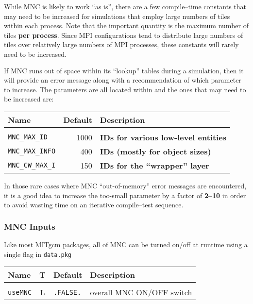 While MNC is likely to work ``as is'', there are a few compile--time
constants that may need to be increased for simulations that employ
large numbers of tiles within each process.  Note that the important
quantity is the maximum number of tiles \textbf{per process}.  Since
MPI configurations tend to distribute large numbers of tiles over
relatively large numbers of MPI processes, these constants will rarely
need to be increased.

If MNC runs out of space within its ``lookup'' tables during a
simulation, then it will provide an error message along with a
recommendation of which parameter to increase.  The parameters are all
located within 
and the ones that may need to be increased are:

\begin{center}
  {\footnotesize
    \begin{tabular}[htb]{|l|r|l|}\hline
      \textbf{Name}  &  
      \textbf{Default}  &  \textbf{Description}  \\\hline
      &  &  \\
      \texttt{MNC\_MAX\_ID}  &  1000  & 
      \textbf{IDs for various low-level entities}  \\
      \texttt{MNC\_MAX\_INFO}  &   400  & 
      \textbf{IDs (mostly for object sizes)}  \\
      \texttt{MNC\_CW\_MAX\_I}  &  150  & 
      \textbf{IDs for the ``wrapper'' layer}  \\\hline
    \end{tabular}
  }
\end{center}

In those rare cases where MNC ``out-of-memory'' error messages are
encountered, it is a good idea to increase the too-small parameter by
a factor of \textbf{2--10} in order to avoid wasting time on an
iterative compile--test sequence.


\subsubsection{MNC Inputs}

Like most MITgcm packages, all of MNC can be turned on/off at runtime
using a single flag in \texttt{data.pkg}
\begin{center}
  {\footnotesize
    \begin{tabular}[htb]{|l|c|l|l|}\hline
      \textbf{Name}  &  \textbf{T}  &  
      \textbf{Default}  &  \textbf{Description}  \\\hline
      &  &  &  \\
      \texttt{useMNC}  &  L  & \texttt{.FALSE.}  &  
      overall MNC ON/OFF switch  \\\hline
    \end{tabular}
  }
\end{center}

